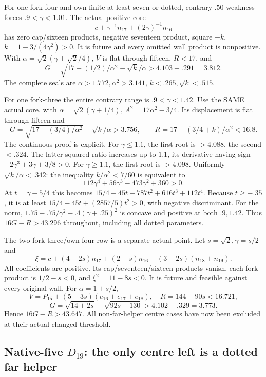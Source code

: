 \documentclass[11pt]{article}
\theoremstyle{definition}
\theoremstyle{remark}
\begin{document}
For one fork-four and own
finite at least seven or dotted,
contrary \(.50\) weakness forces
\(.9<\gamma<1.01\).
The actual positive core
\[
                         c+\gamma^{-1}n_{17}+(2\gamma)^{-1}n_{16}
\]
has zero cap/sixteen products,
negative seventeen product,
square \(-k\),
\(k=1-3/(4\gamma^2)>0\).
It is future and every omitted
wall product is nonpositive.
With
\(\alpha=\sqrt2(\gamma+\sqrt2/4)\),
\(V\) is flat through fifteen,
\(R<17\), and
\[
              G=\sqrt{17-(1/2)/\alpha^2}-\sqrt k/\alpha
                                      >4.103-.291=3.812 .
\]
The complete seals are
\(\alpha>1.772,\alpha^2>3.141\),
\(k<.265,\sqrt k<.515\).

For one fork-three the entire
contrary range is
\(.9<\gamma<1.42\).
Use the SAME actual core, with
\(\alpha=\sqrt2(\gamma+1/4)\),
\(A^2=17\alpha^2-3/4\).
Its displacement is flat through
fifteen and
\[
 G=\sqrt{17-(3/4)/\alpha^2}-\sqrt k/\alpha>3.756,\qquad
                    R=17-(3/4+k)/\alpha^2<16.8 .
\]
The continuous proof is explicit.
For \(\gamma\le1.1\), the first
root is \(>4.088\), the second
\(<.324\).
The latter squared ratio increases
up to \(1.1\), its derivative
having sign
\(-2\gamma^3+3\gamma+3/8>0\).
For \(\gamma\ge1.1\), the first
root is \(>4.098\).
Uniformly \(\sqrt k/\alpha<.342\):
the inequality \(k/\alpha^2<7/60\)
is equivalent to
\[
                    112\gamma^4+56\gamma^3-473\gamma^2+360>0 .
\]
At \(t=\gamma-5/4\) this becomes
\(15/4-45t+787t^2+616t^3+112t^4\).
Because \(t\ge-.35\), it is at
least
\(15/4-45t+(2857/5)t^2>0\),
with negative discriminant.
For the norm,
\(1.75-.75/\gamma^2-.4(\gamma+.25)^2\)
is concave and positive at
both \(.9,1.42\).
Thus \(16G-R>43.296\) throughout,
including all dotted parameters.

The two-fork-three/own-four row
is a separate actual point.
Let \(s=\sqrt2,\gamma=s/2\) and
\[
 \xi=c+(4-2s)n_{17}+(2-s)n_{16}
                                 +(3-2s)(n_{18}+n_{19}).
\]
All coefficients are positive.
Its cap/seventeen/sixteen products
vanish, each fork product is
\(1/2-s<0\), and
\(\xi^2=11-8s<0\).
It is future and feasible
against every original wall.
For \(\alpha=1+s/2\),
\[
 V=P_{15}+(5-3s)(e_{16}+e_{17}+e_{18}),\quad
 R=144-90s<16.721,
\]
\[
 G=\sqrt{14+2s}-\sqrt{92s-130}
                                      >4.102-.329=3.773 .
\]
Hence \(16G-R>43.647\).
All non-far-helper centre cases
have now been excluded at their
actual changed threshold.

\subsection{Native-five \(D_{19}\): the only centre left is a dotted far helper}
\label{app:exact19:Dfivefarcentre}
\end{document}
